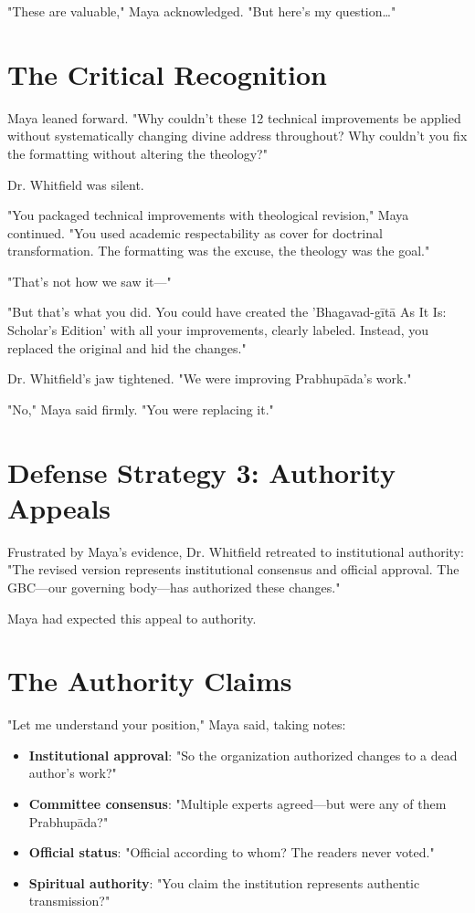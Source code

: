 \documentclass[11pt,twoside]{book}
\begin{document}
"These are valuable," Maya acknowledged. "But here's my question\ldots{}"
\section*{The Critical Recognition}
\label{sec:orgf49115a}

Maya leaned forward. "Why couldn't these 12 technical improvements be applied without systematically changing divine address throughout? Why couldn't you fix the formatting without altering the theology?"

Dr. Whitfield was silent.

"You packaged technical improvements with theological revision," Maya continued. "You used academic respectability as cover for doctrinal transformation. The formatting was the excuse, the theology was the goal."

"That's not how we saw it—"

"But that's what you did. You could have created the 'Bhagavad-gītā As It Is: Scholar's Edition' with all your improvements, clearly labeled. Instead, you replaced the original and hid the changes."

Dr. Whitfield's jaw tightened. "We were improving Prabhupāda's work."

"No," Maya said firmly. "You were replacing it."
\section*{Defense Strategy 3: Authority Appeals}
\label{sec:org64ebdea}

Frustrated by Maya's evidence, Dr. Whitfield retreated to institutional authority: "The revised version represents institutional consensus and official approval. The GBC—our governing body—has authorized these changes."

Maya had expected this appeal to authority.
\section*{The Authority Claims}
\label{sec:org5b0a595}

"Let me understand your position," Maya said, taking notes:

\begin{itemize}
\item \textbf{\textbf{Institutional approval}}: "So the organization authorized changes to a dead author's work?"
\item \textbf{\textbf{Committee consensus}}: "Multiple experts agreed—but were any of them Prabhupāda?"
\item \textbf{\textbf{Official status}}: "Official according to whom? The readers never voted."
\item \textbf{\textbf{Spiritual authority}}: "You claim the institution represents authentic transmission?"
\end{itemize}
\end{document}
